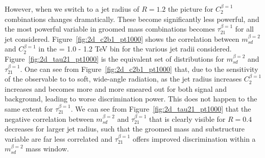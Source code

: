 However, when we switch to a jet radius of $R=1.2$ the picture for
$C_2^{\beta=1}$ combinations changes dramatically. These become
significantly less powerful, and the most powerful variable in groomed
mass combinations becomes $\tau_{21}^{\beta=1}$ for all jet
\pT considered. Figure~\ref{fig:2d_c2b1_pt1000} shows the correlation between
$m_{sd}^{\beta=2}$ and $C_2^{\beta=1}$ in the \pT = 1.0 - 1.2 TeV bin for
the various jet radii considered. Figure~\ref{fig:2d_tau21_pt1000} is
the equivalent set of distributions for $m_{sd}^{\beta=2}$ and
$\tau_{21}^{\beta=1}$. One can see from
Figure~\ref{fig:2d_c2b1_pt1000} that, due to the sensitivity of the
observable to to soft, wide-angle radiation, as the jet radius increases
$C_2^{\beta=1}$ increases and becomes more and more smeared out for both signal and
background, leading to worse discrimination power. This does not
happen to the same extent for $\tau_{21}^{\beta=1}$. We can see from Figure~\ref{fig:2d_tau21_pt1000} that
the negative correlation between $m_{sd}^{\beta=2}$ and
$\tau_{21}^{\beta=1}$ that is clearly visible for $R=0.4$ decreases for
larger jet radius, such that the groomed mass and substructure variable
are far less correlated and $\tau_{21}^{\beta=1}$ offers improved
discrimination within a $m_{sd}^{\beta=2}$ mass window.



